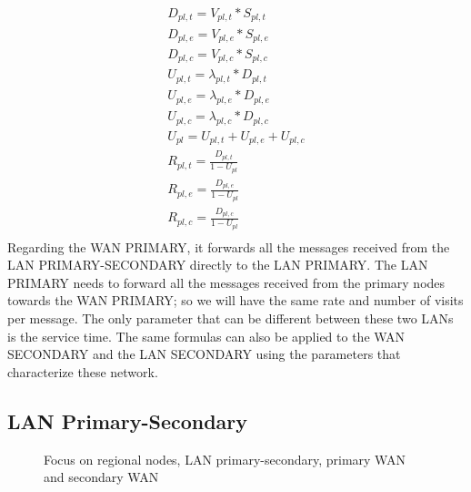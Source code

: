 \documentclass[11pt]{article}
\begin{document}
\begin{equation}
    \begin{array}{l}
        D_{pl, t} = V_{pl, t} * S_{pl, t} \\
        D_{pl, e} = V_{pl, e} * S_{pl, e} \\
        D_{pl, c} = V_{pl, c} * S_{pl, c} \\
        U_{pl, t} = \lambda_{pl, t} * D_{pl, t} \\
        U_{pl, e} = \lambda_{pl, e} * D_{pl, e} \\
        U_{pl, c} = \lambda_{pl, c} * D_{pl, c} \\
        U_{pl} = U_{pl, t} + U_{pl, e} + U_{pl, c} \\
        R_{pl, t} = \frac{D_{pl, t}}{1 - U_{pl}} \\
        R_{pl, e} = \frac{D_{pl, e}}{1 - U_{pl}} \\
        R_{pl, c} = \frac{D_{pl, c}}{1 - U_{pl}} \\
    \end{array}
\end{equation}
Regarding the WAN PRIMARY, it forwards all the messages received from the LAN PRIMARY-SECONDARY directly to the LAN PRIMARY. The LAN PRIMARY needs to forward all the messages received from the primary nodes towards the WAN PRIMARY; so we will have the same rate and number of visits per message. The only parameter that can be different between these two LANs is the service time.
The same formulas can also be applied to the WAN SECONDARY and the LAN SECONDARY using the parameters that characterize these network.

\subsection{LAN Primary-Secondary}

\begin{figure}[H]
	\hspace*{-3.75cm}
	\centering
	\frame{}
	\caption{Focus on regional nodes, LAN primary-secondary, primary WAN and secondary WAN}
\end{figure}
\end{document}

